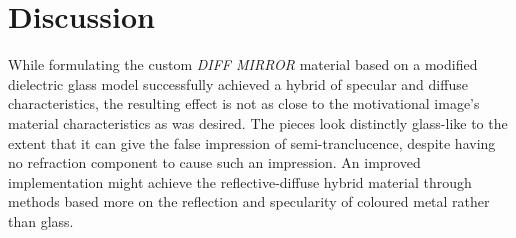 \documentclass[11pt, a4paper]{article}
\begin{document}
\section*{Discussion}
While formulating the custom \textit{DIFF MIRROR} material based on a modified dielectric glass model successfully achieved a hybrid of specular and diffuse characteristics, the resulting effect is not as close to the motivational image's material characteristics as was desired. The pieces look distinctly glass-like to the extent that it can give the false impression of semi-tranclucence, despite having no refraction component to cause such an impression. An improved implementation might achieve the reflective-diffuse hybrid material through methods based more on the reflection and specularity of coloured metal rather than glass.



\end{document}
